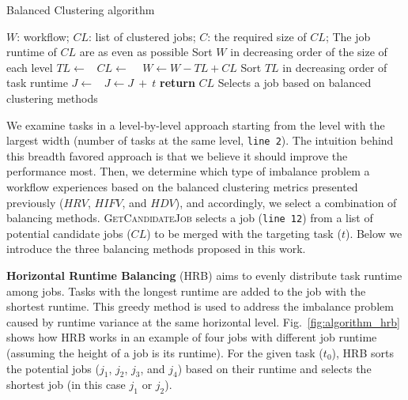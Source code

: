 \begin{algorithm}[htb]
	\caption{ Balanced Clustering algorithm}
	\footnotesize
	\label{alg:admit}
	\begin{algorithmic}[1]
		\Require $W$: workflow; $CL$: list of clustered jobs; $C$: the required size of $CL$; 
		\Ensure The job runtime of $CL$ are as even as possible
			\State Sort $W$ in decreasing order of the size of each level
				\State $TL\gets $\  
				\State $CL\gets$  \  
				\State $W \gets W - TL + CL$   
			\EndFor
		\EndProcedure
			\State Sort $TL$ in decreasing order of task runtime
				\State $J \gets $\  
				\State  $J \gets J\ +\ t$ 
			\EndFor
			\State \textbf{return} $CL$
		\EndProcedure
			\State Selects a job based on balanced clustering methods
		\EndProcedure
	\end{algorithmic}
\end{algorithm}

We examine tasks in a level-by-level approach starting from the level with the largest width (number of tasks at the same level, \texttt{line 2}). The intuition behind this breadth favored approach is that we believe it should improve the performance most. Then, we determine which type of imbalance problem a workflow experiences based on the balanced clustering metrics presented previously ($HRV$, $HIFV$, and $HDV$), and accordingly, we select a combination of balancing methods. \textsc{GetCandidateJob} selects a job (\texttt{line 12}) from a list of potential candidate jobs ($CL$) to be merged with the targeting task ($t$). Below we introduce the three balancing methods proposed in this work.

\textbf{Horizontal Runtime Balancing} (HRB) aims to evenly distribute task runtime among jobs. Tasks with the longest runtime are added to the job with the shortest runtime. This greedy method is used to address the imbalance problem caused by runtime variance at the same horizontal level. Fig.~\ref{fig:algorithm_hrb} shows how HRB works in an example of four jobs with different job runtime (assuming the height of a job is its runtime). For the given task ($t_0$), HRB sorts the potential jobs ($j_1$, $j_2$, $j_3$, and $j_4$) based on their runtime and selects the shortest job (in this case $j_1$ or $j_2$). 


